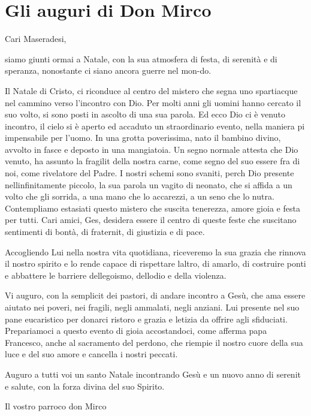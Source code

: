 \documentclass[a5paper,10pt]{article} %
\title{} %
\author{}
\begin{document}
  \maketitle
  
  \clearpage
  
  \clearpage
  
\section{Gli auguri di Don Mirco}
Cari Maseradesi,

siamo giunti ormai a Natale, con la sua atmosfera di festa, di serenità e di speranza, nonostante ci siano ancora guerre nel mon-do.

Il Natale di Cristo, ci riconduce al centro del mistero che segna uno spartiacque nel cammino verso l'incontro con Dio. Per molti anni gli uomini hanno cercato il suo volto, si sono posti in ascolto di una sua parola. Ed ecco Dio ci è venuto incontro, il cielo si è aperto ed  accaduto un straordinario evento, nella maniera pi impensabile per l'uomo. In una grotta poverissima,  nato il bambino divino, avvolto in fasce e deposto in una mangiatoia. Un segno normale attesta che Dio  venuto, ha assunto la fragilit della nostra carne, come segno del suo essere fra di noi, come rivelatore del Padre. I nostri schemi sono svaniti, perch Dio  presente nellinfinitamente piccolo, la sua parola un vagito di neonato, che si affida a un volto che gli sorrida, a una mano che lo accarezzi, a un seno che lo nutra. Contempliamo estasiati questo mistero che suscita tenerezza, amore gioia e festa per tutti. Cari amici, Ges, desidera essere il centro di queste feste che suscitano sentimenti di bontà, di fraternit, di giustizia e di pace.

Accogliendo Lui nella nostra vita quotidiana, riceveremo la sua grazia che rinnova il nostro spirito e lo rende capace di rispettare laltro, di amarlo, di costruire ponti e abbattere le barriere dellegoismo, dellodio e della violenza.

Vi auguro, con la semplicit dei pastori, di andare incontro a Gesù, che ama essere aiutato nei poveri, nei fragili, negli ammalati, negli anziani. Lui  presente nel suo pane eucaristico per donarci ristoro e grazia e letizia da offrire agli sfiduciati. Prepariamoci a questo evento di gioia accostandoci, come afferma papa Francesco, anche al sacramento del perdono, che riempie il nostro cuore della sua luce e del suo amore e cancella i nostri peccati.

Auguro a tutti voi un santo Natale incontrando Gesù e un nuovo anno di serenit e salute, con la forza divina del suo Spirito.

Il vostro parroco don Mirco
\end{document}
